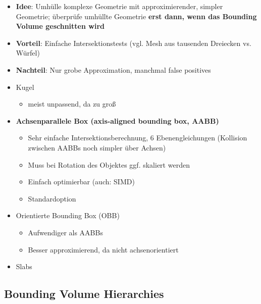 \begin{itemize}
	\item \textbf{Idee}: Umhülle komplexe Geometrie mit approximierender, simpler Geometrie; überprüfe umhüllte Geometrie \textbf{erst dann, wenn das Bounding Volume geschnitten wird}
	\item \textbf{Vorteil}: Einfache Intersektionstests (vgl. Mesh aus tausenden Dreiecken vs. Würfel)
	\item \textbf{Nachteil}: Nur grobe Approximation, manchmal false positives
	\item Kugel
	\begin{itemize}
		\item meist unpassend, da zu groß
	\end{itemize}
	\item \textbf{Achsenparallele Box (axis-aligned bounding box, AABB)}
	\begin{itemize}
		\item Sehr einfache Intersektionsberechnung, 6 Ebenengleichungen (Kollision zwischen AABBs noch simpler über Achsen)
		\item Muss bei Rotation des Objektes ggf. skaliert werden
		\item Einfach optimierbar (auch: SIMD)
		\item Standardoption
	\end{itemize}
	\item Orientierte Bounding Box (OBB)
	\begin{itemize}
		\item Aufwendiger als AABBs
		\item Besser approximierend, da nicht achsenorientiert
	\end{itemize}
	\item Slabs
\end{itemize}

\newpage
\subsection{Bounding Volume Hierarchies}%
\label{ds:sub:bounding_volume_hierarchies}

